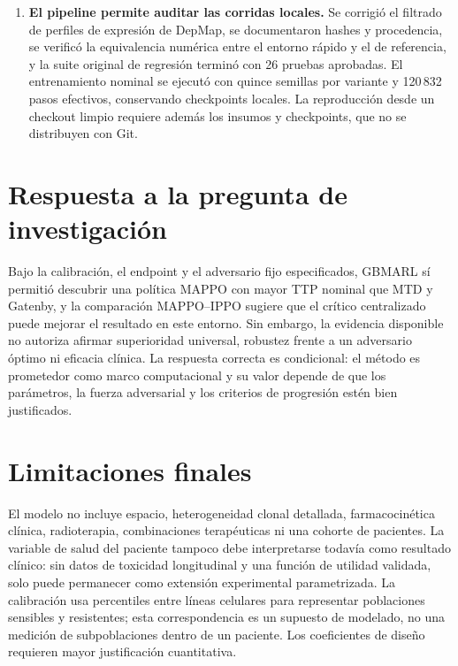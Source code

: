 \begin{enumerate}
  \item \textbf{El pipeline permite auditar las corridas locales.} Se corrigió el filtrado de perfiles de expresión de DepMap, se documentaron hashes y procedencia, se verificó la equivalencia numérica entre el entorno rápido y el de referencia, y la suite original de regresión terminó con 26 pruebas aprobadas. El entrenamiento nominal se ejecutó con quince semillas por variante y 120\,832 pasos efectivos, conservando checkpoints locales. La reproducción desde un checkout limpio requiere además los insumos y checkpoints, que no se distribuyen con Git.
\end{enumerate}

\section*{Respuesta a la pregunta de investigación}
{}

Bajo la calibración, el endpoint y el adversario fijo especificados, GBMARL sí permitió descubrir una política MAPPO con mayor TTP nominal que MTD y Gatenby, y la comparación MAPPO--IPPO sugiere que el crítico centralizado puede mejorar el resultado en este entorno. Sin embargo, la evidencia disponible no autoriza afirmar superioridad universal, robustez frente a un adversario óptimo ni eficacia clínica. La respuesta correcta es condicional: el método es prometedor como marco computacional y su valor depende de que los parámetros, la fuerza adversarial y los criterios de progresión estén bien justificados.

\section*{Limitaciones finales}
{}

El modelo no incluye espacio, heterogeneidad clonal detallada, farmacocinética clínica, radioterapia, combinaciones terapéuticas ni una cohorte de pacientes. La variable de salud del paciente tampoco debe interpretarse todavía como resultado clínico: sin datos de toxicidad longitudinal y una función de utilidad validada, solo puede permanecer como extensión experimental parametrizada. La calibración usa percentiles entre líneas celulares para representar poblaciones sensibles y resistentes; esta correspondencia es un supuesto de modelado, no una medición de subpoblaciones dentro de un paciente. Los coeficientes de diseño requieren mayor justificación cuantitativa.

